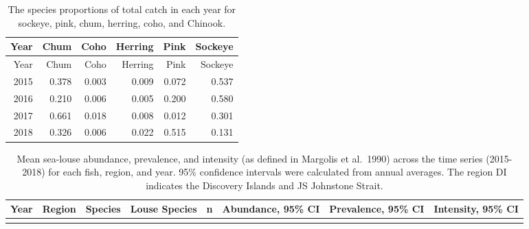 \documentclass[fleqn,10pt]{wlpeerj} %
\begin{document}
\begin{longtable}[]{@{}rrrrrr@{}}
\caption{\label{tab:proportion-table} The species proportions of total catch in each year for sockeye, pink, chum, herring, coho, and Chinook.}\tabularnewline
\toprule
Year & Chum & Coho & Herring & Pink & Sockeye\tabularnewline
\midrule
\endfirsthead
\toprule
Year & Chum & Coho & Herring & Pink & Sockeye\tabularnewline
\midrule
\endhead
2015 & 0.378 & 0.003 & 0.009 & 0.072 & 0.537\tabularnewline
2016 & 0.210 & 0.006 & 0.005 & 0.200 & 0.580\tabularnewline
2017 & 0.661 & 0.018 & 0.008 & 0.012 & 0.301\tabularnewline
2018 & 0.326 & 0.006 & 0.022 & 0.515 & 0.131\tabularnewline
\bottomrule
\end{longtable}

\begin{longtable}[]{@{}llllrlll@{}}
\caption{\label{tab:sealice-table} Mean sea-louse abundance, prevalence, and intensity (as defined in Margolis et al.~1990) across the time series (2015-2018) for each fish, region, and year. 95\% confidence intervals were calculated from annual averages. The region DI indicates the Discovery Islands and JS Johnstone Strait.}\tabularnewline
\toprule
\begin{minipage}[b]{0.04\columnwidth}\raggedright
Year\strut
\end{minipage} & \begin{minipage}[b]{0.06\columnwidth}\raggedright
Region\strut
\end{minipage} & \begin{minipage}[b]{0.07\columnwidth}\raggedright
Species\strut
\end{minipage} & \begin{minipage}[b]{0.13\columnwidth}\raggedright
Louse Species\strut
\end{minipage} & \begin{minipage}[b]{0.03\columnwidth}\raggedleft
n\strut
\end{minipage} & \begin{minipage}[b]{0.15\columnwidth}\raggedright
Abundance, 95\% CI\strut
\end{minipage} & \begin{minipage}[b]{0.16\columnwidth}\raggedright
Prevalence, 95\% CI\strut
\end{minipage} & \begin{minipage}[b]{0.15\columnwidth}\raggedright
Intensity, 95\% CI\strut
\end{minipage}\tabularnewline
\midrule
\endfirsthead
\toprule
\begin{minipage}[b]{0.04\columnwidth}\raggedright

\end{minipage}
\end{longtable}
\end{document}
